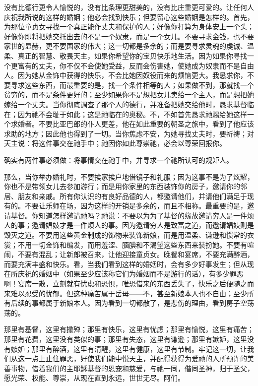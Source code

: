 没有比德行更令人愉悦的，没有比条理更甜美的，没有比庄重更可爱的。让任何人庆祝我所说的这样的婚姻；他必会找到快乐；但要留心这些婚姻是怎样的。首先，为那位童贞女寻找一个真正能作丈夫和保护的人；好像你打算为身体安上一个头；好像你即将把她交托出去的不是一个奴隶，而是一个女儿。不要寻求金钱，也不要家世的显赫，更不要国家的伟大；这一切都是多余的；而是要寻求灵魂的虔诚、温柔、真正的智慧、敬畏天主，如果你希望你的宝贝快乐地生活。因为如果你寻找一个更富有的丈夫，你不仅不会使她受益，反而会伤害她，使她成为奴隶而不是自由人。因为她从金饰中获得的快乐，不会比她因奴役而来的烦恼更大。我恳求你，不要寻求这些东西，而最重要的是，找一个条件相等的人；如果做不到，那就找一个贫穷的，而不是条件更好的；至少如果你不是想把女儿卖给一个主人，而是想把她嫁给一个丈夫。当你彻底调查了那个人的德行，并准备把她交给他时，恳求基督临在；因为祂不会耻于如此；这是祂临在的奥秘。不，不如首先恳求祂赐给她这样一个求婚者。不要比亚巴郎的仆人更差，他在如此重要的朝圣之旅中，看到了他应该求助的地方；因此他也得到了一切。当你焦虑不安，为她寻找丈夫时，要祈祷；对天主说：将这件事交在祂手中；祂因你如此尊崇祂，必会以尊荣回报你。\par

确实有两件事必须做：将事情交在祂手中，并寻求一个祂所认可的规矩人。\par

那么，当你举办婚礼时，不要挨家挨户地借镜子和礼服；因为这事不是为了炫耀，你也不是带领女儿去参加游行；而是用你家里的东西装饰你的房子，邀请你的邻居、朋友和亲戚。所有你认识的有良好品德的人，都邀请他们，并请他们满足于现有的。不要让乐师在场，因为这样的开销是多余的，而且不相称。最重要的是，邀请基督。你知道怎样邀请祂吗？祂说：不要以为为了基督的缘故邀请穷人是一件烦人的事；邀请娼妓才是一件烦人的事。因为邀请穷人是致富之道，而邀请娼妓则是毁灭之道。不要用这些黄金制成的饰物来装饰新娘，而是用温柔、谦逊和惯常的衣裳；不用一切金饰和编发，而用羞涩、腼腆和不渴望这些东西来装扮她。不要有喧闹，不要有混乱；让新郎被召来，让他迎接童贞女。晚餐和宴席，不要充满醉酒，而要充满丰盛和快乐。看，当我们看到这样的婚姻时，会有多少好事发生；但从现在所庆祝的婚姻中（如果至少应该称它们为婚姻而不是游行的话），有多少罪恶啊！宴席一散，立刻就有忧虑和恐惧，唯恐借来的东西丢失了，快乐之后便随之而来难以忍受的忧郁。但这种痛苦属于岳母——不，甚至新娘本人也不自由；至少所有后续的事都属于新娘本人。因为看到一切都散了，是悲伤的理由，看到房子空荡荡的。\par

那里有基督，这里有撒殚；那里有快乐，这里有忧虑；那里有愉悦，这里有痛苦；那里有花费，这里没有类似的事；那里有失态，这里有谦逊；那里有嫉妒，这里没有嫉妒；那里有醉酒，这里有清醒，这里有健康，这里有节制。牢记这一切，让我们从这一点上止住罪恶，好使我们能中悦天主，并配得获得为爱祂的人所预许的美善事物，借着我们的主耶稣基督的恩宠和慈爱，与祂一同，偕同圣神，归于圣父，愿光荣、权能、尊崇，从现在直到永远，世世无尽。阿们。\par

